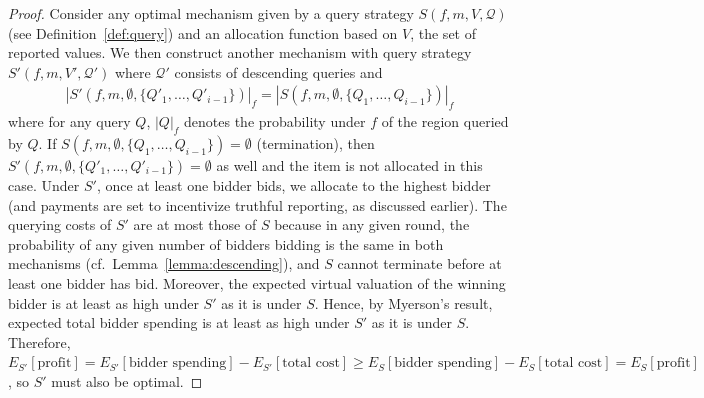 \begin{proof}
Consider any optimal mechanism given by a
query strategy $S(f, m, V, \mathcal Q)$ (see Definition~\ref{def:query}) and an
allocation function based on $V$, the set of reported values.
We then construct another mechanism
with query strategy $S'(f, m, V', \mathcal Q')$ where $\mathcal Q'$
consists of descending queries
and 
\begin{align*}
|S'(f, m, \emptyset, \{Q'_1, \ldots, Q'_{i-1}\})|_f %
  = |S(f, m, \emptyset, \{Q_1, \ldots, Q_{i-1}\})|_f
\end{align*}
where for any query $Q$, $|Q|_f$ denotes the probability under $f$ of the
region queried by $Q$.  If $S(f, m, \emptyset, \{Q_1, \ldots,
Q_{i-1}\})=\emptyset$ (termination), then $S'(f, m, \emptyset, \{Q'_1, \ldots,
Q'_{i-1}\})=\emptyset$ as well and the item is not allocated in this case.
Under $S'$, once at least one bidder bids, we allocate to the highest
bidder (and payments are set to incentivize truthful reporting, as
discussed earlier).  The querying costs of $S'$ are at most those of $S$
because in any given round, the probability of any given number of bidders
bidding is the same in both mechanisms (cf.~Lemma~\ref{lemma:descending}), and $S$ cannot terminate before at least one bidder has bid. 
Moreover, the expected virtual valuation of the winning bidder is at
least as high under $S'$ as it is under $S$.
Hence, by Myerson's result, expected total bidder spending is at least 
as high under $S'$ as it is under $S$.
Therefore,
 $E_{S'}[\text{profit}]
= E_{S'}[\text{bidder spending}] - E_{S'}[\text{total cost}]
 \geq E_{S}[\text{bidder spending}] - E_{S}[\text{total cost}]
= E_{S}[\text{profit}]$, so $S'$ must also be optimal.

\end{proof}
